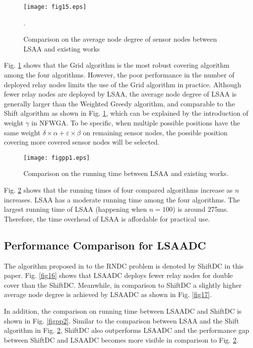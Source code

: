 \documentclass[journal]{IEEEtran}
\begin{document}
 \begin{figure}
\begin{center}
\texttt{[image: fig15.eps]}    \caption{Comparison on the average node degree of sensor nodes between LSAA and existing works}.
\label{fig15}                                 \end{center}                                 \end{figure}

Fig. \ref{fig15} shows that the Grid algorithm is the most robust covering algorithm among the four algorithms. However, the poor performance in the number of deployed relay nodes limits the use of the Grid algorithm in practice. Although fewer relay nodes are deployed by LSAA, the average node degree of LSAA is generally larger than the Weighted Greedy algorithm, and comparable to the Shift algorithm as shown in Fig. \ref{fig15}, which can be explained by the introduction of weight $\gamma$ in NFWGA. To be specific, when multiple possible positions have the same weight $\delta\times \alpha+\varepsilon\times\beta$ on remaining sensor nodes, the possible position covering more covered sensor nodes will be selected.

 \begin{figure}
\begin{center}
\texttt{[image: figpp1.eps]}    \caption{Comparison on the running time between LSAA and existing works.}
\label{figpp1}                                 \end{center}                                 \end{figure}

Fig. \ref{figpp1} shows that the running times of four compared algorithms increase as $n$ increases. LSAA has a moderate running time among the four algorithms. The largest running time of LSAA (happening when $n=100$) is around 275ms. Therefore, the time overhead of LSAA is affordable for practical use. \subsection{Performance Comparison for LSAADC}
The algorithm proposed in \cite{Tang06} to the RNDC problem is denoted by ShiftDC in this paper. Fig. \ref{fig16} shows that LSAADC deploys fewer relay nodes for double cover than the ShiftDC. Meanwhile, in comparison to ShiftDC a slightly higher average node degree is achieved by LSAADC as shown in Fig. \ref{fig17}.

In addition, the comparison on running time between LSAADC and ShiftDC is shown in Fig. \ref{figpp2}. Similar to the comparison between LSAA and the Shift algorithm in Fig. \ref{figpp1}, ShiftDC also outperforms LSAADC and the performance gap between ShiftDC and LSAADC becomes more visible in comparison to Fig. \ref{figpp1}.
\end{document}
